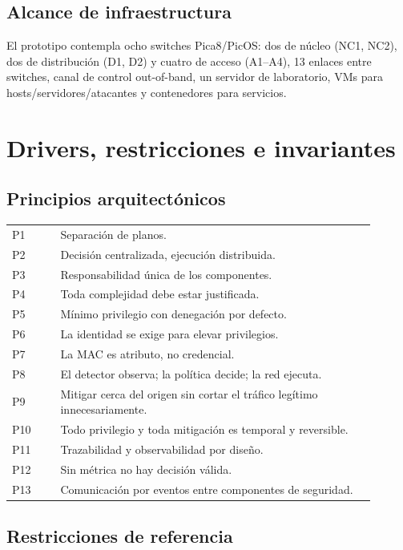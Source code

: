 \documentclass[11pt,a4paper]{article}
\begin{document}
\subsection{Alcance de infraestructura}

El prototipo contempla ocho switches Pica8/PicOS: dos de núcleo (NC1, NC2), dos de distribución (D1, D2) y cuatro de acceso (A1--A4), 13 enlaces entre switches, canal de control out-of-band, un servidor de laboratorio, VMs para hosts/servidores/atacantes y contenedores para servicios.

\section{Drivers, restricciones e invariantes}

\subsection{Principios arquitectónicos}

\begin{longtable}{p{0.12\linewidth}p{0.78\linewidth}}
\toprule
P1 & Separación de planos.\\
P2 & Decisión centralizada, ejecución distribuida.\\
P3 & Responsabilidad única de los componentes.\\
P4 & Toda complejidad debe estar justificada.\\
P5 & Mínimo privilegio con denegación por defecto.\\
P6 & La identidad se exige para elevar privilegios.\\
P7 & La MAC es atributo, no credencial.\\
P8 & El detector observa; la política decide; la red ejecuta.\\
P9 & Mitigar cerca del origen sin cortar el tráfico legítimo innecesariamente.\\
P10 & Todo privilegio y toda mitigación es temporal y reversible.\\
P11 & Trazabilidad y observabilidad por diseño.\\
P12 & Sin métrica no hay decisión válida.\\
P13 & Comunicación por eventos entre componentes de seguridad.\\
\bottomrule
\end{longtable}

\subsection{Restricciones de referencia}
\end{document}
